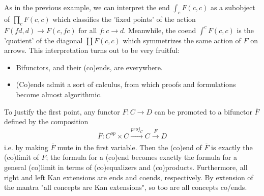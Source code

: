 As in the previous example, we can interpret the end $\int_{c} F(c,c)$ as a subobject of $\prod_c F(c,c)$ which classifies the 'fixed points' of the action $F(fd,d)\rightarrow F(c,fc)$ for all $f:c\rightarrow d$. Meanwhile, the coend $\int^c F(c,c)$ is the 'quotient' of the diagonal $\coprod F(c,c)$ which symmetrizes the same action of $F$ on arrows. This interpretation turns out to be very fruitful:
\begin{itemize}
    \item Bifunctors, and their (co)ends, are everywhere. 
    \item (Co)ends admit a sort of calculus, from which proofs and formulations become almost algorithmic.
\end{itemize}

To justify the first point, any functor $F:C\rightarrow D$ can be promoted to a bifunctor $\overline{F}$ defined by the composition $$\overline{F}:C^{op}\times C\xrightarrow[]{proj_C}C\xrightarrow[]{F} D$$ i.e. by making $\overline{F}$ mute in the first variable. Then the (co)end of $\overline{F}$ is exactly the (co)limit of $F$; the formula for a (co)end becomes exactly the formula for a general (co)limit in terms of (co)equalizers and (co)products. Furthermore, all right and left Kan extensions are ends and coends, respectively. By extension of the mantra "all concepts are Kan extensions", so too are all concepts co/ends.

